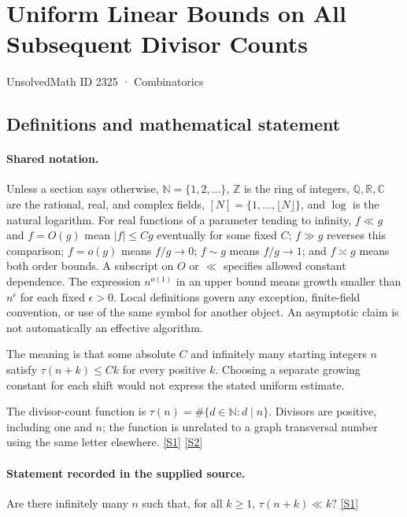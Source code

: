 \documentclass[11pt,a4paper]{article}
\newcommand{\N}{\mathbb{N}}
\newcommand{\Z}{\mathbb{Z}}
\newcommand{\Q}{\mathbb{Q}}
\newcommand{\R}{\mathbb{R}}
\newcommand{\C}{\mathbb{C}}
\newcommand{\sref}[2]{\hyperlink{source:#1:#2}{[S#2]}}
\begin{document}

\setcounter{section}{2324}

\section{Uniform Linear Bounds on All Subsequent Divisor Counts}\label{2325}

{\small\sffamily UnsolvedMath ID 2325 · Combinatorics}

\subsection{Definitions and mathematical statement}

\paragraph{Shared notation.}Unless a section says otherwise, $\N=\{1,2,\ldots\}$,
$\Z$ is the ring of integers, $\Q,\R,\C$ are the rational, real, and complex
fields, $[N]=\{1,\ldots,\lfloor N\rfloor\}$, and $\log$ is the natural
logarithm. For real functions of a parameter tending to infinity,
$f\ll g$ and $f=O(g)$ mean $|f|\leq Cg$ eventually for some fixed $C$;
$f\gg g$ reverses this comparison; $f=o(g)$ means $f/g\to0$;
$f\sim g$ means $f/g\to1$; and $f\asymp g$ means both order bounds.
A subscript on $O$ or $\ll$ specifies allowed constant dependence.
The expression $n^{o(1)}$ in an upper bound means growth smaller than
$n^\epsilon$ for each fixed $\epsilon>0$. Local definitions govern any
exception, finite-field convention, or use of the same symbol for another
object. An asymptotic claim is not automatically an effective algorithm.



The meaning is that some absolute $C$ and infinitely many starting integers $n$ satisfy $\tau(n+k)\leq Ck$ for every positive $k$. Choosing a separate growing constant for each shift would not express the stated uniform estimate.

The divisor-count function is $\tau(n)=\#\{d\in\N:d\mid n\}$. Divisors are positive, including one and $n$; the function is unrelated to a graph transversal number using the same letter elsewhere. \sref{2325}{1} \sref{2325}{2}

\paragraph{Statement recorded in the supplied source.}
Are there infinitely many $n$ such that, for all $k\geq 1$, $ \tau(n+k)\ll k? $ \sref{2325}{1}
\end{document}
